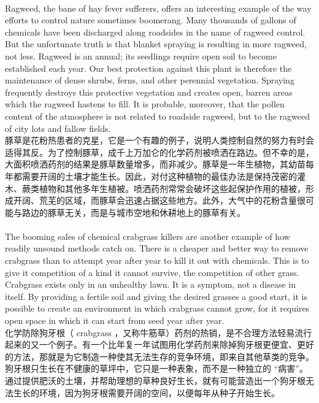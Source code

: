\documentclass{article}
\begin{document}
\\
Ragweed, the bane of hay fever sufferers, offers an interesting example of the way efforts to control nature sometimes boomerang. Many thousands of gallons of chemicals have been discharged along roadsides in the name of ragweed control. But the unfortunate truth is that blanket spraying is resulting in more ragweed, not less. Ragweed is an annual; its seedlings require open soil to become established each year. Our best protection against this plant is therefore the maintenance of dense shrubs, ferns, and other perennial vegetation. Spraying frequently destroys this protective vegetation and creates open, barren areas which the ragweed hastens to fill. It is probable, moreover, that the pollen content of the atmosphere is not related to roadside ragweed, but to the ragweed of city lots and fallow fields.\\
豚草是花粉热患者的克星，它是一个有趣的例子，说明人类控制自然的努力有时会适得其反。为了控制豚草，成千上万加仑的化学药剂被喷洒在路边。但不幸的是，大面积喷洒药剂的结果是豚草数量增多，而非减少。豚草是一年生植物，其幼苗每年都需要开阔的土壤才能生长。因此，对付这种植物的最佳办法是保持茂密的灌木、蕨类植物和其他多年生植被。喷洒药剂常常会破坏这些起保护作用的植被，形成开阔、荒芜的区域，而豚草会迅速占据这些地方。此外，大气中的花粉含量很可能与路边的豚草无关，而是与城市空地和休耕地上的豚草有关。 \\

\\
The booming sales of chemical crabgrass killers are another example of how readily unsound methods catch on. There is a cheaper and better way to remove crabgrass than to attempt year after year to kill it out with chemicals. This is to give it competition of a kind it cannot survive, the competition of other grass. Crabgrass exists only in an unhealthy lawn. It is a symptom, not a disease in itself. By providing a fertile soil and giving the desired grasses a good start, it is possible to create an environment in which crabgrass cannot grow, for it requires open space in which it can start from seed year after year.\\
化学防除狗牙根（ crabgrass ，又称牛筋草）药剂的热销，是不合理方法轻易流行起来的又一个例子。有一个比年复一年试图用化学药剂来除掉狗牙根更便宜、更好的方法，那就是为它制造一种使其无法生存的竞争环境，即来自其他草类的竞争。狗牙根只生长在不健康的草坪中，它只是一种表象，而不是一种独立的 “病害”。通过提供肥沃的土壤，并帮助理想的草种良好生长，就有可能营造出一个狗牙根无法生长的环境，因为狗牙根需要开阔的空间，以便每年从种子开始生长。 \\
\end{document}
